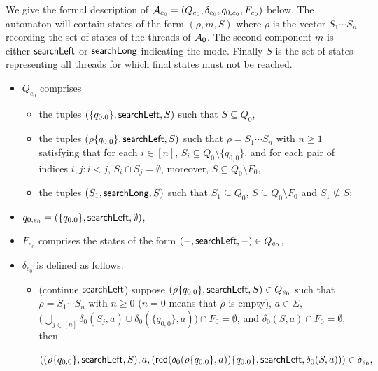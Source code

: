 We give the formal description of $\mathcal{A}_{e_0}=(Q_{e_0}, \delta_{e_0}, q_{0,e_0}, F_{e_0})$ below.
The automaton will contain states of the form $(\rho, m, S)$ where $\rho$ is the vector $S_1\cdots S_n$ recording the set of states of the threads of $\mathcal{A}_0$. The second component $m$ is either $\mathsf{searchLeft}$ or $\mathsf{searchLong}$ indicating the mode.
Finally $S$ is the set of states representing all threads for which final states must not be reached.
\begin{itemize}
	\item $Q_{e_0}$ comprises 
	\begin{itemize}
		\item the tuples $(\{q_{0,0}\}, \mathsf{searchLeft}, S)$ such that $S \subseteq Q_0$,
		\item the tuples $(\rho \{q_{0,0}\}, \mathsf{searchLeft}, S)$ such that  $\rho = S_1 \cdots S_n$ with $n \ge 1$ satisfying that for each $i \in [n]$, $S_i \subseteq Q_0 \setminus \{q_{0,0}\}$, and for each pair of indices $i, j: i < j$, $S_i \cap S_j = \emptyset$, moreover, $S \subseteq Q_0 \setminus F_0$, 
		\item the tuples $(S_1, \mathsf{searchLong}, S)$ such that $S_1 \subseteq Q_0$, $S \subseteq Q_0 \setminus F_0$ and $S_1 \not \subseteq S$;
	\end{itemize}
	\item $q_{0,e_0}= (\{q_{0,0}\}, \mathsf{searchLeft}, \emptyset)$,
	\item $F_{e_0}$ comprises the states of the form $(-, \mathsf{searchLeft}, -) \in Q_{e_0}$,
	\item $\delta_{e_0}$ is defined as follows: 
	\begin{itemize}
		\item (continue $\mathsf{searchLeft}$) suppose $(\rho \{q_{0,0}\}, \mathsf{searchLeft}, S) \in Q_{e_0}$ such that $\rho = S_1 \cdots S_n$ with $n \ge 0$  ($n = 0$ means that $\rho$ is empty), $a \in \Sigma$, $\big(\bigcup \limits_{j \in [n]} \delta_0(S_j, a) \cup \delta_0(\{q_{0,0}\},a)\big) \cap F_0 = \emptyset$, and $\delta_0(S,a) \cap F_0 = \emptyset$, then 
		\medskip
		
		\hspace{5mm} $\left((\rho  \{q_{0,0}\}, \mathsf{searchLeft}, S), a, \left(\mathsf{red}(\delta_0(\rho\{q_{0,0}\}, a)) \{q_{0,0}\}, \mathsf{searchLeft}, \delta_0(S,a) \right) \right) \in \delta_{e_0},$
		

\end{itemize}
\end{itemize}
